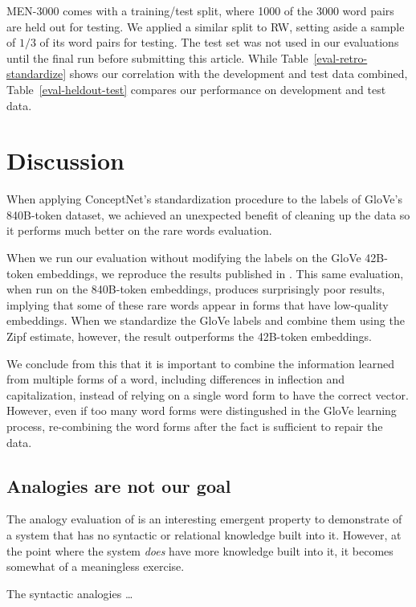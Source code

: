\documentclass[letterpaper]{article}
\begin{document}
{\sc MEN-3000}
comes with a training/test split, where 1000 of the 3000 word pairs are held
out for testing. We applied a similar split to {\sc RW}, setting aside a sample
of $1/3$ of its word pairs for testing. The test set was not used in our
evaluations until the final run before submitting this article. While
Table~\ref{eval-retro-standardize} shows our correlation with the development
and test data combined, Table~\ref{eval-heldout-test} compares our performance
on development and test data.



\section{Discussion}

When applying ConceptNet's standardization procedure to the labels of GloVe's
840B-token dataset, we achieved an unexpected benefit of cleaning up the data
so it performs much better on the rare words evaluation.

When we run our evaluation without modifying the labels on the GloVe 42B-token
embeddings, we reproduce the results published in \cite{pennington2014glove}.
This same evaluation, when run on the 840B-token embeddings, produces
surprisingly poor results, implying that some of these rare words appear in
forms that have low-quality embeddings. When we standardize the GloVe labels
and combine them using the Zipf estimate, however, the result outperforms the
42B-token embeddings.

We conclude from this that it is important to combine the information learned
from multiple forms of a word, including differences in inflection and
capitalization, instead of relying on a single word form to have the correct
vector. However, even if too many word forms were distingushed in the GloVe
learning process, re-combining the word forms after the fact is sufficient to
repair the data.

\subsection{Analogies are not our goal}
\label{analogies-meh}

The analogy evaluation of \cite{mikolov2013word2vec} is an interesting
emergent property to demonstrate of a system that has no syntactic or
relational knowledge built into it. However, at the point where the system
{\em does} have more knowledge built into it, it becomes somewhat of
a meaningless exercise.

The syntactic analogies \ldots

\begin{CJK*}{UTF8}{min}

\end{CJK*}
\end{document}
